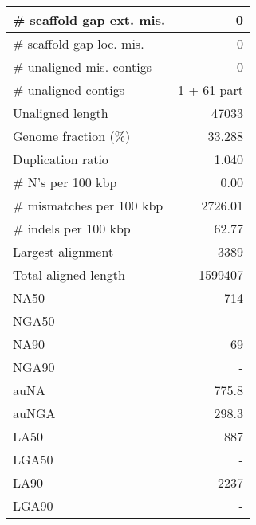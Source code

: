 \documentclass[12pt,a4paper]{article}
\begin{document}
\begin{table}[ht]
\begin{center}
\begin{tabular}{|l*{1}{|r}|}
\# scaffold gap ext. mis. & 0 \\ \hline
\# scaffold gap loc. mis. & 0 \\ \hline
\# unaligned mis. contigs & 0 \\ \hline
\# unaligned contigs & 1 + 61 part \\ \hline
Unaligned length & 47033 \\ \hline
Genome fraction (\%) & 33.288 \\ \hline
Duplication ratio & 1.040 \\ \hline
\# N's per 100 kbp & 0.00 \\ \hline
\# mismatches per 100 kbp & 2726.01 \\ \hline
\# indels per 100 kbp & 62.77 \\ \hline
Largest alignment & 3389 \\ \hline
Total aligned length & 1599407 \\ \hline
NA50 & 714 \\ \hline
NGA50 & - \\ \hline
NA90 & 69 \\ \hline
NGA90 & - \\ \hline
auNA & 775.8 \\ \hline
auNGA & 298.3 \\ \hline
LA50 & 887 \\ \hline
LGA50 & - \\ \hline
LA90 & 2237 \\ \hline
LGA90 & - \\ \hline
\end{tabular}
\end{center}
\end{table}
\end{document}
